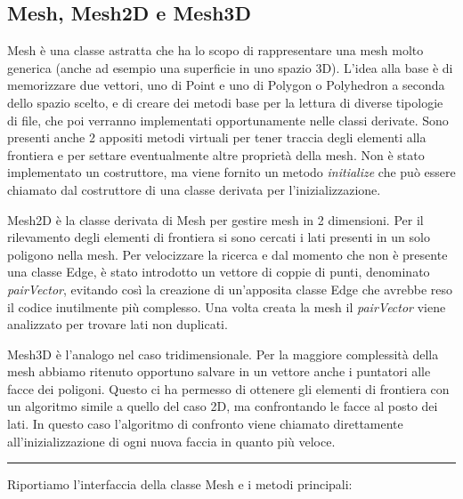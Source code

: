 \documentclass[oneside,12pt]{book}  %
\theoremstyle{plain}
\theoremstyle{definition}
\theoremstyle{remark}
\numberwithin{equation}{chapter} %
\begin{document}
\subsection{Mesh, Mesh2D e Mesh3D}
Mesh \`e una classe astratta che ha lo scopo di rappresentare
una mesh molto generica (anche ad esempio una superficie in uno spazio
3D). L'idea alla base \`e di memorizzare due vettori, uno di Point e
uno di Polygon o Polyhedron a seconda dello spazio scelto, e di creare
dei metodi base per la lettura di diverse tipologie di file, che poi
verranno implementati opportunamente nelle classi derivate. Sono
presenti anche 2 appositi metodi virtuali per tener traccia degli elementi alla
frontiera e per settare eventualmente altre propriet\`a della mesh. Non \`e
stato implementato un costruttore, ma viene fornito un metodo
\textit{initialize} che pu\`o essere chiamato dal costruttore di una
classe derivata per l'inizializzazione.

Mesh2D \`e la classe derivata di Mesh per gestire mesh in 2
dimensioni. Per il rilevamento degli elementi di frontiera si sono
cercati i lati presenti in un solo poligono nella mesh. Per
velocizzare la ricerca e dal momento che non \`e presente una classe
Edge, \`e stato introdotto un vettore di coppie di punti, denominato
\textit{pairVector}, evitando cos\`i la creazione di un'apposita
classe Edge che avrebbe reso il codice inutilmente pi\`u complesso.
Una volta creata la mesh il \textit{pairVector} viene analizzato per
trovare lati non duplicati.


Mesh3D \`e l'analogo nel caso tridimensionale. Per la maggiore
complessit\`a della mesh abbiamo ritenuto opportuno salvare in un
vettore anche i puntatori alle facce dei poligoni. Questo ci ha permesso di
ottenere gli elementi di frontiera con un algoritmo simile a quello
del caso 2D, ma confrontando le facce al posto dei lati. In questo
caso l'algoritmo di confronto viene chiamato direttamente all'inizializzazione di ogni nuova
faccia in quanto pi\`u veloce.

\noindent\rule{14cm}{1pt}

Riportiamo l'interfaccia della classe Mesh e i metodi principali:
\end{document}
